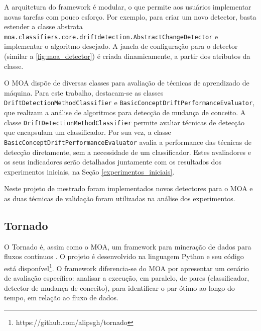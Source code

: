 \documentclass[qual, classic, a4paper]{ufbathesis}
\begin{document}
A arquitetura do framework é modular, o que permite aos usuários implementar novas tarefas com pouco esforço.
Por exemplo, para criar um novo detector, basta estender a classe abstrata \texttt{moa.classifiers.core.driftdetection.AbstractChangeDetector} e implementar o algoritmo desejado.
A janela de configuração para o detector (similar a \ref{fig:moa_detector}) é criada dinamicamente, a partir dos atributos da classe.

O MOA dispõe de diversas classes para avaliação de técnicas de aprendizado de máquina. 
Para este trabalho, destacam-se as classes \texttt{DriftDetectionMethodClassifier} e \texttt{BasicConceptDriftPerformanceEvaluator}, 
que realizam a análise de algoritmos para detecção de mudança de conceito.
A classe \texttt{DriftDetectionMethodClassifier} permite avaliar técnicas de detecção que encapsulam um classificador.
Por sua vez, a classe \texttt{BasicConceptDriftPerformanceEvaluator} avalia a performance das técnicas de detecção diretamente, 
sem a necessidade de um classificador.
Estes avaliadores e os seus indicadores serão detalhados juntamente com os resultados dos experimentos iniciais, na Seção \ref{experimentos_iniciais}. 

Neste projeto de mestrado foram implementados novos detectores para o MOA e as duas técnicas de validação foram utilizadas na análise dos experimentos.

\subsection{Tornado}

O Tornado é, assim como o MOA, um framework para mineração de dados para fluxos contínuos \cite{Pesaranghader:Tornado}.
O projeto é desenvolvido na linguagem Python e seu código está disponível\footnote{https://github.com/alipsgh/tornado}.
O framework diferencia-se do MOA por apresentar um cenário de avaliação específico: 
analisar a execução, em paralelo, de pares (classificador, detector de mudança de conceito), 
para identificar o par ótimo ao longo do tempo, em relação ao fluxo de dados.
\end{document}
